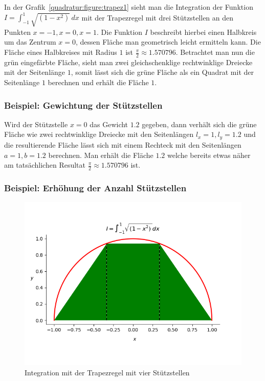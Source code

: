 \noindent
In der Grafik~\ref{quadratur:figure:trapez1} sieht man die Integration der Funktion $I = \int_{-1}^{1}\sqrt{(1-x^2)}\,dx$
mit der Trapezregel mit drei Stützstellen an den Punkten $x=-1, x=0, x=1$.
Die Funktion $I$ beschreibt hierbei einen Halbkreis um das Zentrum $x=0$, 
dessen Fläche man geometrisch leicht ermitteln kann.
Die Fläche eines Halbkreises mit Radius $1$ ist $\frac{\pi}{2} \approx 1.570796$.
Betrachtet man nun die grün eingefärbte Fläche, sieht man zwei gleichschenklige rechtwinklige Dreiecke mit der Seitenlänge $1$,
somit lässt sich die grüne Fläche als ein Quadrat mit der Seitenlänge $1$ berechnen und erhält die Fläche $1$.

\newpage

\subsubsection{Beispiel: Gewichtung der Stützstellen}
Wird der Stützstelle $x=0$ das Gewicht $1.2$ gegeben, dann verhält sich die grüne Fläche wie zwei rechtwinklige Dreiecke 
mit den Seitenlängen $l_{x}=1, l_{y}=1.2$ und die resultierende Fläche lässt sich mit einem Rechteck mit den Seitenlängen
$a=1, b=1.2$ berechnen.
Man erhält die Fläche $1.2$ welche bereits etwas näher am tatsächlichen Resultat $\frac{\pi}{2} \approx 1.570796$ ist.

\subsubsection{Beispiel: Erhöhung der Anzahl Stützstellen}

\begin{figure}[!h]
    \centering
    \includegraphics[scale=0.6]{papers/quadratur/figures/GaussTrapez2}
    \caption{Integration mit der Trapezregel mit vier Stützstellen
    \label{quadratur:figure:trapez2}}  
\end{figure}

